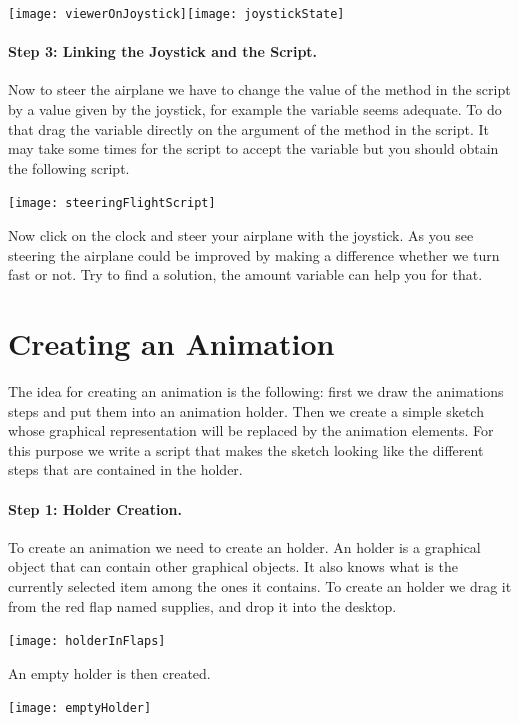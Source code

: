 \begin{center}\texttt{[image: viewerOnJoystick]}\texttt{[image: joystickState]}\end{center}

\paragraph{Step 3: Linking the Joystick and the Script.}
Now to steer the airplane we have to change the value of the method  in the script
by a value given by the joystick, for example the  variable seems adequate. 
To do that drag the variable directly on the argument of the  method in the script. 
It may take some times for the script to accept the variable but you should obtain the following script. 
\begin{center}\texttt{[image: steeringFlightScript]}\end{center}
Now click on the clock and steer your airplane with the joystick. As you see steering the airplane could be improved by making a difference whether we turn fast or not. Try to find a solution, the amount variable can help you for that.  

\section{Creating an Animation}

The idea for creating an animation is the following: first we draw the animations steps and put them into an animation holder. Then we create
a simple sketch whose graphical representation will be replaced by the animation elements. For this purpose we write a script that makes the sketch looking like the different steps that are contained in the holder.

\paragraph{Step 1: Holder Creation.}
To create an animation we need to create an holder. An holder is a graphical object that can contain other graphical objects. It also knows what is the currently selected item among the ones it contains. To create an holder we drag it from the red flap named supplies, and drop it into the desktop.

\begin{center}\texttt{[image: holderInFlaps]}\end{center} 
An empty holder is then created. 
\begin{center}\texttt{[image: emptyHolder]}\end{center}

